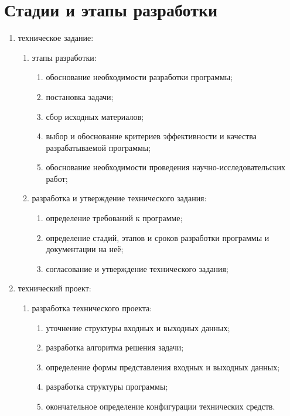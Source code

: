 \documentclass{../TechDoc}
\begin{document}
    \section{Стадии и этапы разработки}
    
    \begin{enumerate}
        \item техническое задание:
        \begin{enumerate}
            \item этапы разработки:
            \begin{enumerate}
                \item обоснование необходимости разработки программы; 
                \item постановка задачи; 
                \item сбор исходных материалов; 
                \item выбор и обоснование критериев эффективности и качества разрабатываемой программы; 
                \item обоснование необходимости проведения научно-исследовательских работ; 
            \end{enumerate}
            \item разработка и утверждение технического задания:
            \begin{enumerate}
                \item определение требований к программе; 
                \item определение стадий, этапов и сроков разработки программы и документации на неё; 
                \item согласование и утверждение технического задания; 
            \end{enumerate}
        \end{enumerate}
    \item технический проект:
    \begin{enumerate}
        \item разработка технического проекта:
        \begin{enumerate}
            \item уточнение структуры входных и выходных данных; 
            \item разработка алгоритма решения задачи; 
            \item определение формы представления входных и выходных данных; 
            \item разработка структуры программы; 
            \item окончательное определение конфигурации технических средств. 

\end{enumerate}
\end{enumerate}
\end{enumerate}
\end{document}
